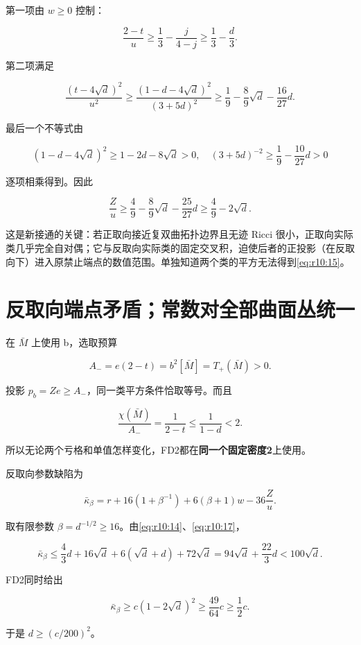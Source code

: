 \documentclass[UTF8,11pt,fontset=none]{ctexart}
\begin{document}
第一项由 \(w\ge0\) 控制：

\[
\frac{2-t}{u}\ge\frac13-\frac j{4-j}\ge\frac13-\frac d3.
\]

第二项满足

\[
\frac{(t-4\sqrt d)^2}{u^2}
\ge\frac{(1-d-4\sqrt d)^2}{(3+5d)^2}
\ge\frac19-\frac89\sqrt d-\frac{16}{27}d.
\]

最后一个不等式由

\[
(1-d-4\sqrt d)^2\ge1-2d-8\sqrt d>0,
\quad
(3+5d)^{-2}\ge\frac19-\frac{10}{27}d>0
\]

逐项相乘得到。因此

\[
\frac Zu\ge\frac49-\frac89\sqrt d-\frac{25}{27}d
\ge\boxed{\frac49-2\sqrt d.}
\tag{10.17}\label{eq:r10:17}
\]

这是新接通的关键：若正取向接近复双曲拓扑边界且无迹 Ricci 很小，正取向实际类几乎完全自对偶；它与反取向实际类的固定交叉积，迫使后者的正投影（在反取向下）进入原禁止端点的数值范围。单独知道两个类的平方无法得到\eqref{eq:r10:15}。

\section{反取向端点矛盾；常数对全部曲面丛统一}\label{ch10:ux53cdux53d6ux5411ux7aefux70b9ux77dbux76feux5e38ux6570ux5bf9ux5168ux90e8ux66f2ux9762ux4e1bux7edfux4e00}

在 \(\bar M\) 上使用 b，选取预算

\[
A_-=e(2-t)=b^2[\bar M]=T_+(\bar M)>0.
\]

投影 \(p_b=Ze\ge A_-\)，同一类平方条件恰取等号。而且

\[
\frac{\chi(\bar M)}{A_-}=\frac1{2-t}
\le\frac1{1-d}<2.
\tag{10.18}\label{eq:r10:18}
\]

所以无论两个亏格和单值怎样变化，FD2都在\textbf{同一个固定密度2}上使用。

反取向参数缺陷为

\[
\bar\kappa_\beta
=r+16(1+\beta^{-1})+6(\beta+1)w-36\frac Zu.
\tag{10.19}\label{eq:r10:19}
\]

取有限参数 \(\beta=d^{-1/2}\ge16\)。由\eqref{eq:r10:14}、\eqref{eq:r10:17}，

\[
\bar\kappa_\beta
\le\frac43d+16\sqrt d+6(\sqrt d+d)+72\sqrt d
=94\sqrt d+\frac{22}{3}d
<100\sqrt d.
\tag{10.20}\label{eq:r10:20}
\]

FD2同时给出

\[
\bar\kappa_\beta\ge c(1-2\sqrt d)^2
\ge\frac{49}{64}c\ge\frac12c.
\tag{10.21}\label{eq:r10:21}
\]

于是 \(d\ge(c/200)^2\)。
\end{document}
